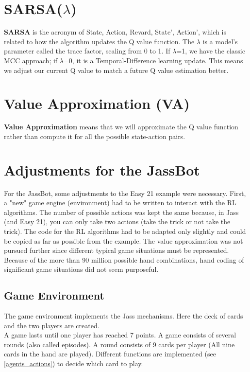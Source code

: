 \section{SARSA($ \lambda $)}
\textbf{SARSA} is the acronym of State, Action, Revard, State', Action', which is related to how the algorithm updates the Q value function. The $ \lambda $ is a model's parameter called the trace factor, scaling from 0 to 1. If $ \lambda $=1, we have the classic MCC approach; if $ \lambda $=0, it is a Temporal-Difference learning update. This means we adjust our current Q value to match a future Q value estimation better.

\section{Value Approximation (VA)}
\textbf{Value Approximation} means that we will approximate the Q value function rather than compute it for all the possible state-action pairs.

\section{Adjustments for the JassBot}
For the JassBot, some adjustments to the Easy 21 example were necessary. First, a "new" game engine (environment) had to be written to interact with the RL algorithms. The number of possible actions was kept the same because, in Jass (and Easy 21), you can only take two actions (take the trick or not take the trick). The code for the RL algorithms had to be adapted only slightly and could be copied as far as possible from the example.
The value approximation was not pursued further since different typical game situations must be represented. Because of the more than 90 million possible hand combinations, hand coding of significant game situations did not seem purposeful.

\subsection{Game Environment}
The game environment implements the Jass mechanisms. Here the deck of cards and the two players are created. \\
A game lasts until one player has reached 7 points. A game consists of several rounds (also called episodes). A round consists of 9 cards per player (All nine cards in the hand are played). Different functions are implemented (see \ref{agents_actions}) to decide which card to play.

